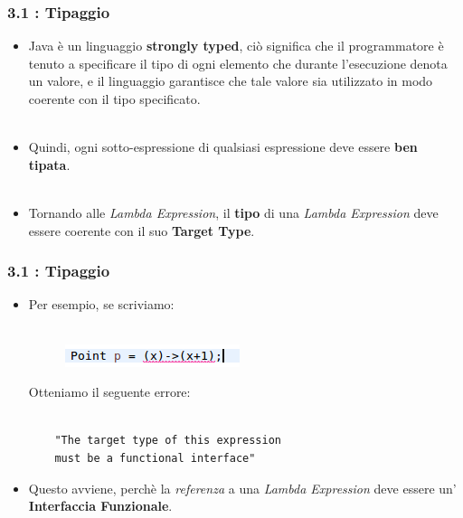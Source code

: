 \documentclass{beamer}
\begin{document}

\begin{frame}
	\frametitle{\textbf{3.1 : Tipaggio}}
	\begin{itemize}
		\item 
			Java è un linguaggio \textbf{strongly typed}, ciò significa che il programmatore è tenuto a specificare il tipo di ogni elemento che durante l'esecuzione denota un valore, e il linguaggio garantisce che tale valore sia utilizzato in modo coerente con il tipo specificato.\\\
		\item 
			Quindi, ogni sotto-espressione di qualsiasi espressione deve essere \textbf{ben tipata}.\\\
		\item 
			Tornando alle \textit{Lambda Expression}, il \textbf{tipo} di una \textit{Lambda Expression} deve essere coerente con il suo \textbf{Target Type}.
	\end{itemize}
\end{frame}


\begin{frame}[fragile]
	\frametitle{\textbf{3.1 : Tipaggio}}
	\begin{itemize}
		\item 
			Per esempio, se scriviamo:\\\
			\begin{figure}
				\centering
				\includegraphics[width=0.3\linewidth]{image/target.png}
				\label{fig:target}
			\end{figure}
			Otteniamo il seguente errore:\\\
\begin{lstlisting}
	"The target type of this expression
	must be a functional interface"
\end{lstlisting}
		\item 
			Questo avviene, perchè la \textit{referenza} a una \textit{Lambda Expression} deve essere un' \textbf{Interfaccia Funzionale}.
	\end{itemize}
\end{frame}

\end{document}
